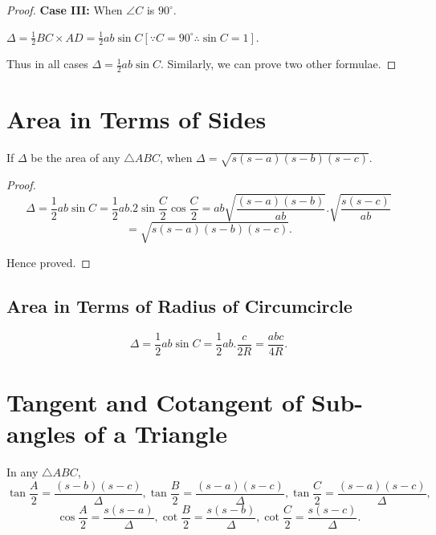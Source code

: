 \begin{proof}
  \noindent \textbf{Case III:} When $\angle C$ is $90^\circ$.
  \begin{center}
  \end{center}
  $\Delta = \frac{1}{2}BC\times AD = \frac{1}{2}ab\sin C[\because C=90^\circ \therefore \sin C = 1]$.

  \noindent Thus in all cases $\Delta = \frac{1}{2}ab\sin C$. Similarly, we can prove two other formulae.
\end{proof}

\section{Area in Terms of Sides}
\begin{theorem}
  If $\Delta$ be the area of any $\triangle ABC$, when $\Delta = \sqrt{s(s - a)(s - b)(s - c)}$.
\end{theorem}

\begin{proof}
  $$\Delta = \frac{1}{2}ab\sin C = \frac{1}{2}ab.2\sin\frac{C}{2}\cos\frac{C}{2} = ab\sqrt{\frac{(s - a)(s -
      b)}{ab}}.\sqrt{\frac{s(s - c)}{ab}}$$
  $$= \sqrt{s(s - a)(s - b)(s - c)}.$$

  \noindent Hence proved.
\end{proof}

\subsection{Area in Terms of Radius of Circumcircle}
$$\Delta = \frac{1}{2}ab\sin C = \frac{1}{2}ab.\frac{c}{2R} = \frac{abc}{4R}.$$

\section{Tangent and Cotangent of Sub-angles of a Triangle}
\begin{theorem}
  In any $\triangle ABC$,
  $$\tan\frac{A}{2} = \frac{(s - b)(s - c)}{\Delta}, \tan\frac{B}{2} = \frac{(s - a)(s - c)}{\Delta}, \tan\frac{C}{2} = \frac{(s -
    a)(s - c)}{\Delta},$$
  $$\cos\frac{A}{2} = \frac{s(s - a)}{\Delta}, \cot\frac{B}{2} = \frac{s(s - b)}{\Delta}, \cot\frac{C}{2} = \frac{s(s -
    c)}{\Delta}.$$
\end{theorem}

